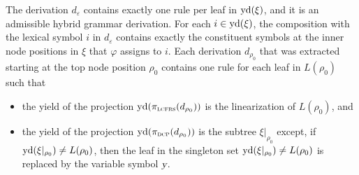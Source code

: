 \documentclass[../../document.tex]{subfiles}
\begin{document}
    The derivation \(d_\varepsilon\) contains exactly one rule per leaf in \(\operatorname{yd}(\xi)\), and it is an admissible hybrid grammar derivation.
    For each \(i \in \operatorname{yd}(\xi)\), the  composition with the lexical symbol \(i\) in \(d_\varepsilon\) contains exactly the constituent symbols at the inner node positions in \(\xi\) that \(\varphi\) assigns to \(i\).
    Each derivation \(d_{\rho_0}\) that was extracted starting at the top node position \(\rho_0\) contains one rule for each leaf in \(L(\rho_0)\) such that
    \begin{itemize}
        \item the yield of the  projection \(\operatorname{yd}(\pi_{\textsc{lcfrs}}(d_{\rho_0}))\) is the linearization of \(L(\rho_0)\), and
        \item the yield of the  projection \(\operatorname{yd}(\pi_{\textsc{dcp}}(d_{\rho_0}))\) is the subtree \(\xi|_{\rho_0}\) except, if \(\operatorname{yd}(\xi|_{\rho_0}) \neq L(\rho_0)\), then the leaf in the singleton set \(\operatorname{yd}(\xi|_{\rho_0}) \neq L(\rho_0)\) is replaced by the variable symbol \(\textsl{y}\).
    \end{itemize}
\end{document}
